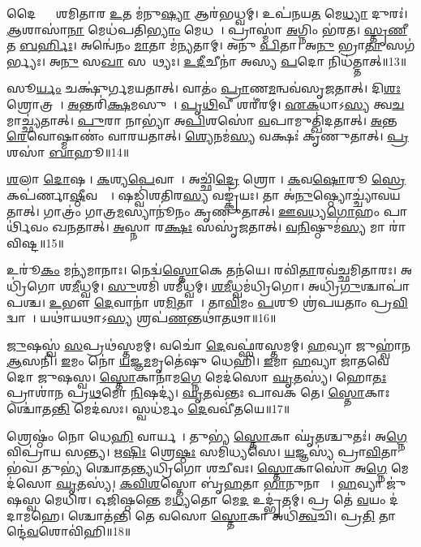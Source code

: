 𑌦𑍈𑌵𑍍𑌯𑌾𑌃᳚ 𑌶𑌮𑌿𑌤𑌾𑌰 \ul{𑌉}𑌤 𑌮॑𑌨𑍁\ul{𑌷𑍍𑌯𑌾} 𑌆𑌰॑𑌭𑌧𑍍𑌵𑌮𑍍।
𑌉𑌪॑𑌨𑌯\ul{𑌤} 𑌮𑍇\ul{𑌧𑍍𑌯𑌾} 𑌦𑍁𑌰𑌃॑।
\ul{𑌆}𑌶𑌾𑌸𑌾॑\ul{𑌨𑌾} 𑌮𑍇𑌧॑𑌪𑌤𑌿\ul{𑌭𑍍𑌯𑌾𑌂} 𑌮𑍇𑌧𑌮𑍍᳚।
𑌪𑍍𑌰𑌾𑌸𑍍𑌮𑌾॑ \ul{𑌅}𑌗𑍍𑌨𑌿𑌂 𑌭॑𑌰𑌤।
\ul{𑌸𑍍𑌤𑍃}\ul{𑌣𑍀}𑌤 \ul{𑌬}\ul{𑌰𑍍}𑌹𑌿𑌃।
𑌅𑌨𑍍𑌵𑍇॑𑌨𑌂 \ul{𑌮𑌾}𑌤𑌾 𑌮॑𑌨𑍍𑌯𑌤𑌾𑌮𑍍।
𑌅𑌨𑍁॑ \ul{𑌪𑌿}𑌤𑌾।
𑌅\ul{𑌨𑍁} 𑌭𑍍𑌰𑌾\ul{𑌤𑌾} 𑌸𑌗॑𑌰𑍍𑌭𑍍𑌯𑌃।
𑌅\ul{𑌨𑍁} 𑌸\ul{𑌖𑌾} 𑌸𑌯𑍂᳚𑌥𑍍𑌯𑌃।
\ul{𑌉}\ul{𑌦𑍀}𑌚𑍀𑌨𑌾॑ 𑌅𑌸𑍍𑌯 \ul{𑌪}𑌦𑍋 𑌨𑌿𑌧॑𑌤𑍍𑌤𑌾𑌤𑍍॥13॥

𑌸𑍂\ul{𑌰𑍍𑌯𑌂} 𑌚𑌕𑍍𑌷𑍁॑𑌰𑍍𑌗𑌮𑌯𑌤𑌾𑌤𑍍।
𑌵𑌾𑌤𑌂॑ \ul{𑌪𑍍𑌰𑌾}𑌣\ul{𑌮}𑌨𑍍𑌵𑌵॑𑌸𑍃𑌜𑌤𑌾𑌤𑍍।
𑌦𑌿\ul{𑌶𑌃} 𑌶𑍍𑌰𑍋𑌤𑍍𑌰𑌮𑍍᳚।
\ul{𑌅}𑌨𑍍𑌤𑌰𑌿॑\ul{𑌕𑍍𑌷}𑌮𑌸𑍁𑌮𑍍᳚।
\ul{𑌪𑍃}\ul{𑌥𑌿}𑌵𑍀 𑌶𑌰𑍀॑𑌰𑌮𑍍।
\ul{𑌏}\ul{𑌕}𑌧𑌾\-𑌽\ul{𑌸𑍍𑌯} 𑌤𑍍𑌵\ul{𑌚}𑌮𑌾𑌚𑍍𑌛𑍍𑌯॑𑌤𑌾𑌤𑍍।
\ul{𑌪𑍁}𑌰𑌾 𑌨𑌾𑌭𑍍𑌯𑌾॑ 𑌅\ul{𑌪𑌿}𑌶𑌸𑍋॑ \ul{𑌵}𑌪𑌾𑌮𑍁𑌤𑍍𑌖𑌿॑𑌦𑌤𑌾𑌤𑍍।
\ul{𑌅}𑌨𑍍𑌤\ul{𑌰𑍇}𑌵𑍋𑌷𑍍𑌮𑌾𑌣𑌂॑ 𑌵𑌾𑌰𑌯𑌤𑌾𑌤𑍍।
\ul{𑌶𑍍𑌯𑍇}𑌨𑌮॑\ul{𑌸𑍍𑌯} 𑌵𑌕𑍍𑌷𑌃॑ 𑌕𑍃𑌣𑍁𑌤𑌾𑌤𑍍।
\ul{𑌪𑍍𑌰}𑌶𑌸𑌾॑ \ul{𑌬𑌾}𑌹𑍂॥14॥

\ul{𑌶}𑌲𑌾 \ul{𑌦𑍋}𑌷𑌣𑍀᳚।
\ul{𑌕}𑌶𑍍𑌯\ul{𑌪𑍇}𑌵𑌾𑌸𑌾᳚।
𑌅𑌚𑍍𑌛𑌿॑\ul{𑌦𑍍𑌰𑍇} 𑌶𑍍𑌰𑍋𑌣𑍀᳚।
\ul{𑌕}𑌵\ul{𑌷𑍋}𑌰𑍂 \ul{𑌸𑍍𑌰𑍇}𑌕𑌪॑𑌰𑍍𑌣𑌾\ul{𑌷𑍍𑌠𑍀}𑌵𑌨𑍍𑌤𑌾᳚।
𑌷𑌡𑍍𑌵𑌿॑𑌶𑌤𑌿𑌰\ul{𑌸𑍍𑌯} 𑌵𑌙𑍍𑌕𑍍𑌰॑𑌯𑌃।
𑌤𑌾 𑌅॑\ul{𑌨𑍁}𑌷𑍍𑌠𑍍𑌯𑍋𑌚𑍍𑌚𑍍𑌯𑌾॑𑌵𑌯𑌤𑌾𑌤𑍍।
𑌗𑌾𑌤𑍍𑌰𑌂॑ 𑌗𑌾𑌤𑍍𑌰\ul{𑌮}𑌸𑍍𑌯𑌾𑌨𑍂॑𑌨𑌂 𑌕𑍃𑌣𑍁𑌤𑌾𑌤𑍍।
\ul{𑌊}\ul{𑌵}\ul{𑌧𑍍𑌯}\ul{𑌗𑍋}𑌹𑌂 𑌪𑌾𑌰𑍍𑌥𑌿॑𑌵𑌂 𑌖𑌨𑌤𑌾𑌤𑍍।
\ul{𑌅}𑌸𑍍𑌨𑌾 𑌰\ul{𑌕𑍍𑌷𑌃} 𑌸𑌸𑍃॑𑌜𑌤𑌾𑌤𑍍।
\ul{𑌵}\ul{𑌨𑌿}𑌷𑍍𑌠𑍁𑌮॑\ul{𑌸𑍍𑌯} 𑌮𑌾 𑌰𑌾॑𑌵𑌿𑌷𑍍𑌟॥15॥

𑌉𑌰𑍂॑\ul{𑌕𑌂} 𑌮𑌨𑍍𑌯॑𑌮𑌾𑌨𑌾𑌃।
𑌨𑍇𑌦𑍍𑌵॑\ul{𑌸𑍍𑌤𑍋}𑌕𑍇 𑌤𑌨॑𑌯𑍇।
𑌰𑌵𑌿॑\ul{𑌤𑌾}𑌰𑌵॑𑌚𑍍𑌛𑌮𑌿𑌤𑌾𑌰𑌃।
𑌅𑌧𑍍𑌰𑌿॑𑌗𑍋 𑌶\ul{𑌮𑍀}𑌧𑍍𑌵𑌮𑍍।
\ul{𑌸𑍁}𑌶𑌮𑌿॑ 𑌶𑌮𑍀𑌧𑍍𑌵𑌮𑍍।
\ul{𑌶}\ul{𑌮𑍀}𑌧𑍍𑌵𑌮॑𑌧𑍍𑌰𑌿𑌗𑍋।
𑌅𑌧𑍍𑌰𑌿॑\ul{𑌗𑍁}𑌶𑍍𑌚𑌾𑌪𑌾॑𑌪𑌶𑍍𑌚।
\ul{𑌉}𑌭𑍗 \ul{𑌦𑍇}𑌵𑌾𑌨𑌾॑ 𑌶\ul{𑌮𑌿}𑌤𑌾𑌰𑍗᳚।
𑌤𑌾\ul{𑌵𑌿}𑌮𑌂 \ul{𑌪}𑌶𑍂 𑌶𑍍𑌰॑𑌪𑌯𑌤𑌾𑌂 𑌪𑍍𑌰\ul{𑌵𑌿}𑌦𑍍𑌵𑌾𑌸𑍗᳚।
𑌯𑌥𑌾॑𑌯𑌥𑌾\-𑌽\ul{𑌸𑍍𑌯} 𑌶𑍍𑌰𑌪॑\ul{𑌣}𑌨𑍍𑌤𑌥𑌾॑𑌤𑌥𑌾॥16॥\anuvakamend[\ul{𑌧}\ul{𑌤𑍍𑌤𑌾}\ul{𑌦𑍍𑌬𑌾}𑌹𑍂 𑌮𑌾 𑌰𑌾॑𑌵𑌿\ul{𑌷𑍍𑌟} 𑌤𑌥𑌾॑𑌤𑌥𑌾]

\ul{𑌜𑍁}𑌷𑌸𑍍𑌵॑ \ul{𑌸}𑌪𑍍𑌰𑌥॑𑌸𑍍𑌤𑌮𑌮𑍍।
𑌵𑌚𑍋॑ \ul{𑌦𑍇}𑌵𑌫𑍍𑌸॑𑌰𑌸𑍍𑌤𑌮𑌮𑍍।
\ul{𑌹}𑌵𑍍𑌯𑌾 𑌜𑍁𑌹𑍍𑌵𑌾॑𑌨 \ul{𑌆}𑌸𑌨𑌿॑।
\ul{𑌇}𑌮𑌂 𑌨𑍋॑ \ul{𑌯}𑌜𑍍𑌞\ul{𑌮}𑌮𑍃𑌤𑍇॑𑌷𑍁 𑌧𑍇𑌹𑌿।
\ul{𑌇}𑌮𑌾 \ul{𑌹}𑌵𑍍𑌯𑌾 𑌜𑌾॑𑌤𑌵𑍇𑌦𑍋 𑌜𑍁𑌷𑌸𑍍𑌵।
\ul{𑌸𑍍𑌤𑍋}𑌕𑌾𑌨𑌾॑𑌮\ul{𑌗𑍍𑌨𑍇} 𑌮𑍇𑌦॑𑌸𑍋 \ul{𑌘𑍃}𑌤𑌸𑍍𑌯॑।
𑌹𑍋\ul{𑌤𑌃} 𑌪𑍍𑌰𑌾𑌶𑌾॑𑌨 𑌪𑍍𑌰\ul{𑌥}𑌮𑍋 \ul{𑌨𑌿}𑌷𑌦𑍍𑌯॑।
\ul{𑌘𑍃}𑌤𑌵॑𑌨𑍍𑌤𑌃 𑌪𑌾𑌵𑌕 𑌤𑍇।
\ul{𑌸𑍍𑌤𑍋}𑌕𑌾𑌃 𑌶𑍍𑌚𑍋॑𑌤\ul{𑌨𑍍𑌤𑌿} 𑌮𑍇𑌦॑𑌸𑌃।
𑌸𑍍𑌵𑌧॑𑌰𑍍𑌮𑌂 \ul{𑌦𑍇}𑌵𑌵𑍀॑𑌤𑌯𑍇॥17॥

𑌶𑍍𑌰𑍇𑌷𑍍𑌠𑌂॑ 𑌨𑍋 𑌧𑍇\ul{𑌹𑌿} 𑌵𑌾𑌰𑍍𑌯𑌮𑍍᳚।
𑌤𑍁𑌭𑍍𑌯॑ \ul{𑌸𑍍𑌤𑍋}𑌕𑌾 𑌘𑍃॑\ul{𑌤}𑌶𑍍𑌚𑍁𑌤𑌃॑।
𑌅\ul{𑌗𑍍𑌨𑍇} 𑌵𑌿𑌪𑍍𑌰𑌾॑𑌯 𑌸𑌨𑍍𑌤𑍍𑌯।
𑌋\ul{𑌷𑌿𑌃} 𑌶𑍍𑌰𑍇\ul{𑌷𑍍𑌠𑌃} 𑌸𑌮𑌿॑𑌧𑍍𑌯𑌸𑍇।
\ul{𑌯}𑌜𑍍𑌞𑌸𑍍𑌯॑ 𑌪𑍍𑌰𑌾\ul{𑌵𑌿}𑌤𑌾 𑌭॑𑌵।
𑌤𑍁𑌭𑍍𑌯॑ 𑌶𑍍𑌚𑍋𑌤𑌨𑍍𑌤𑍍𑌯𑌧𑍍𑌰𑌿𑌗𑍋 𑌶𑌚𑍀𑌵𑌃।
\ul{𑌸𑍍𑌤𑍋}𑌕𑌾𑌸𑍋॑ 𑌅\ul{𑌗𑍍𑌨𑍇} 𑌮𑍇𑌦॑𑌸𑍋 \ul{𑌘𑍃}𑌤𑌸𑍍𑌯॑।
\ul{𑌕}\ul{𑌵𑌿}\ul{𑌶}𑌸𑍍𑌤𑍋 𑌬𑍃॑\ul{𑌹}𑌤𑌾 \ul{𑌭𑌾}𑌨𑍁𑌨𑌾𑌗𑌾𑌃᳚।
\ul{𑌹}𑌵𑍍𑌯𑌾 𑌜𑍁॑𑌷𑌸𑍍𑌵 𑌮𑍇𑌧𑌿𑌰।
𑌓𑌜𑌿॑𑌷𑍍𑌠𑌨𑍍𑌤𑍇 𑌮\ul{𑌧𑍍𑌯}𑌤𑍋 𑌮𑍇\ul{𑌦} 𑌉𑌦𑍍𑌭𑍃॑𑌤𑌮𑍍।
𑌪𑍍𑌰 𑌤𑍇॑ \ul{𑌵}𑌯𑌂 𑌦॑𑌦𑌾𑌮𑌹𑍇।
𑌶𑍍𑌚𑍋𑌤॑𑌨𑍍𑌤𑌿 𑌤𑍇 𑌵𑌸𑍋 \ul{𑌸𑍍𑌤𑍋}𑌕𑌾 𑌅𑌧𑌿॑\ul{𑌤𑍍𑌵}𑌚𑌿।
𑌪𑍍𑌰\ul{𑌤𑌿} 𑌤𑌾𑌨𑍍𑌦𑍇॑\ul{𑌵}𑌶𑍋𑌵𑌿॑𑌹𑌿॥18॥\anuvakamend[\ul{𑌦𑍇}𑌵𑌵𑍀॑𑌤\ul{𑌯} 𑌉𑌦𑍍𑌭𑍃॑\ul{𑌤}𑌨𑍍𑌤𑍍𑌰𑍀𑌣𑌿॑ 𑌚]


